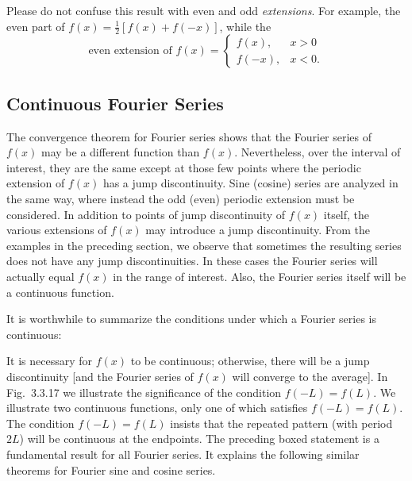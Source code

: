 \begin{center}
\end{center}

Please do not confuse this result with even and odd \textit{extensions}.  For example, the even part of $f(x) = \frac{1}{2}[f(x) + f(-x)]$, while the
\[
\text{even extension of } f(x) = \begin{cases} f(x), & x > 0 \\ f(-x), & x < 0. \end{cases}
\]

\subsection{Continuous Fourier Series}
\label{subsec:continuous-fourier}

The convergence theorem for Fourier series shows that the Fourier series of $f(x)$ may be a different function than $f(x)$.  Nevertheless, over the interval of interest, they are the same except at those few points where the periodic extension of $f(x)$ has a jump discontinuity.  Sine (cosine) series are analyzed in the same way, where instead the odd (even) periodic extension must be considered.  In addition to points of jump discontinuity of $f(x)$ itself, the various extensions of $f(x)$ may introduce a jump discontinuity.  From the examples in the preceding section, we observe that sometimes the resulting series does not have any jump discontinuities.  In these cases the Fourier series will actually equal $f(x)$ in the range of interest.  Also, the Fourier series itself will be a continuous function.

It is worthwhile to summarize the conditions under which a Fourier series is continuous:

\begin{center}
\end{center}

It is necessary for $f(x)$ to be continuous; otherwise, there will be a jump discontinuity [and the Fourier series of $f(x)$ will converge to the average].  In Fig.~3.3.17 we illustrate the significance of the condition $f(-L) = f(L)$.  We illustrate two continuous functions, only one of which satisfies $f(-L) = f(L)$.  The condition $f(-L) = f(L)$ insists that the repeated pattern (with period $2L$) will be continuous at the endpoints.  The preceding boxed statement is a fundamental result for all Fourier series.  It explains the following similar theorems for Fourier sine and cosine series.


